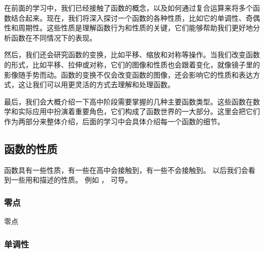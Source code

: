 
\begin{issues}
\issueDraft
\end{issues}


在前面的学习中，我们已经接触了函数的概念，以及如何通过复合运算来将多个函数结合起来。现在，我们将深入探讨一个函数的各种性质，比如它的单调性、奇偶性和周期性。这些性质是理解函数行为和性质的关键，它们能够帮助我们更好地分析函数在不同情况下的表现。

然后，我们还会研究函数的变换，比如平移、缩放和对称等操作。当我们改变函数的形式，比如平移、拉伸或对称，它们的图像和性质也会跟着变化，就像镜子里的影像随手势而动。函数的变换不仅会改变函数的图像，还会影响它的性质和表达方式，这让我们可以用更灵活的方式去理解和处理函数。

最后，我们会大概介绍一下高中阶段需要掌握的几种主要函数类型。这些函数在数学和实际应用中扮演着重要角色，它们构成了函数世界的一大部分。这里会把它们作为两部分来整体介绍，后面的学习中会具体介绍每一个函数的细节。



\subsection{函数的性质}\label{sub_HsFunC_1}

函数具有一些性质，有一些在高中会接触到，有一些不会接触到。
以后我们会看到一些用和描述的性质。 例如 %
， 可导。
\subsubsection{零点}

\begin{definition}{零点}

\end{definition}

\subsubsection{单调性}



